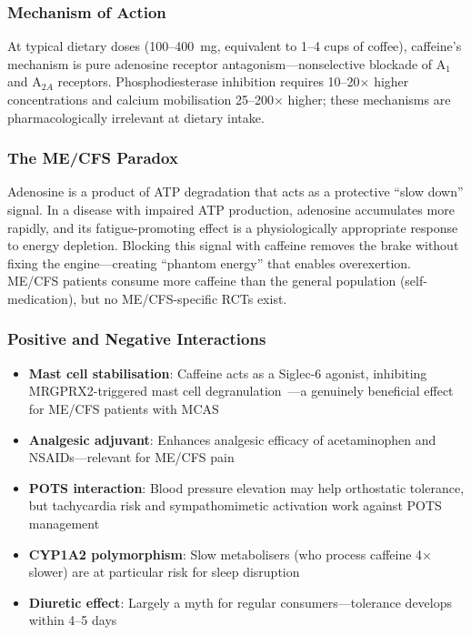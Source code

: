 \subsubsection{Mechanism of Action}

At typical dietary doses (100--400~mg, equivalent to 1--4 cups of coffee), caffeine's mechanism is pure adenosine receptor antagonism---nonselective blockade of A$_1$ and A$_{2A}$ receptors. Phosphodiesterase inhibition requires 10--20$\times$ higher concentrations and calcium mobilisation 25--200$\times$ higher; these mechanisms are pharmacologically irrelevant at dietary intake.

\subsubsection{The ME/CFS Paradox}

Adenosine is a product of ATP degradation that acts as a protective ``slow down'' signal. In a disease with impaired ATP production, adenosine accumulates more rapidly, and its fatigue-promoting effect is a physiologically appropriate response to energy depletion. Blocking this signal with caffeine removes the brake without fixing the engine---creating ``phantom energy'' that enables overexertion. ME/CFS patients consume more caffeine than the general population (self-medication), but no ME/CFS-specific RCTs exist.

\subsubsection{Positive and Negative Interactions}

\begin{itemize}
    \item \textbf{Mast cell stabilisation}: Caffeine acts as a Siglec-6 agonist, inhibiting MRGPRX2-triggered mast cell degranulation~\cite{Wang2025caffeineMast}---a genuinely beneficial effect for ME/CFS patients with MCAS
    \item \textbf{Analgesic adjuvant}: Enhances analgesic efficacy of acetaminophen and NSAIDs---relevant for ME/CFS pain
    \item \textbf{POTS interaction}: Blood pressure elevation may help orthostatic tolerance, but tachycardia risk and sympathomimetic activation work against POTS management
    \item \textbf{CYP1A2 polymorphism}: Slow metabolisers (who process caffeine 4$\times$ slower) are at particular risk for sleep disruption
    \item \textbf{Diuretic effect}: Largely a myth for regular consumers---tolerance develops within 4--5 days
\end{itemize}

